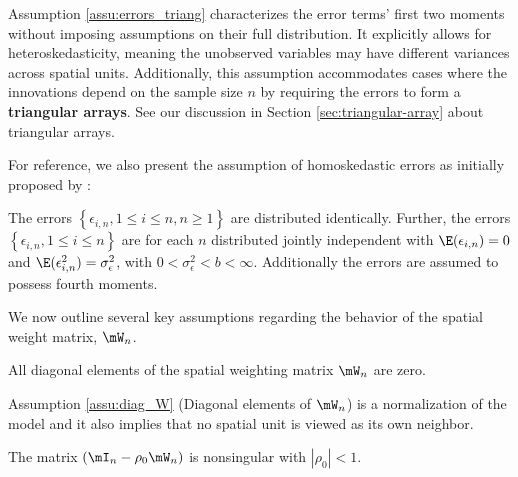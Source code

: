 Assumption \ref{assu:errors_triang} characterizes the error terms' first two moments without imposing assumptions on their full distribution. It explicitly allows for heteroskedasticity, meaning the unobserved variables may have different variances across spatial units. Additionally, this assumption accommodates cases where the innovations depend on the sample size $n$ by requiring the errors to form a \textbf{triangular arrays}. See our discussion in Section \ref{sec:triangular-array} about triangular arrays. 

For reference, we also present the assumption of homoskedastic errors as initially proposed by \cite{kelejian1998generalized}:

\begin{assumption}\label{assu:errors_homoskedastic}
The errors  $\left\lbrace \epsilon_{i,n}, 1 \leq i \leq n, n\geq 1\right\rbrace$ are distributed identically. Further, the errors $\left\lbrace \epsilon_{i,n}, 1 \leq i \leq n\right\rbrace$ are for each $n$ distributed jointly independent with  $\E(\epsilon_{i,n})= 0$ and $\E(\epsilon_{i,n}^2) = \sigma^2_{\epsilon}$, with $0 < \sigma^2_{\epsilon}  < b <\infty$. Additionally the errors are assumed to possess fourth moments.
\end{assumption}

We now outline several key assumptions regarding the behavior of the spatial weight matrix, $\mW_n$.

\begin{assumption}\label{assu:diag_W}
All diagonal elements of the spatial weighting matrix $\mW_n$ are zero.
\end{assumption}

Assumption \ref{assu:diag_W} (Diagonal elements of $\mW_n$) is a normalization of the model and it also implies that no spatial unit is viewed as its own neighbor. 

\begin{assumption}\label{assu:non_singularity}
The matrix $(\mI_n - \rho_0\mW_n)$ is nonsingular with $\left|\rho_0 \right|<1$.
\end{assumption}

